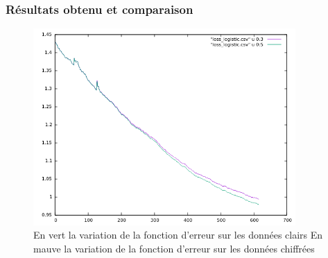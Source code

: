 \documentclass[a4paper,12pt]{article}
\begin{document}
  \subsubsection{Résultats obtenu et comparaison}
  \begin{figure}[h!]\begin{center}
    \includegraphics[width=10cm]{loss_logistic_regression.png}
    \caption{En vert la variation de la fonction d'erreur sur les données clairs\newline
            En mauve la variation de la fonction d'erreur sur les données chiffrées}
     \label{fig:loss_logistic}
  \end{center}
  \end{figure}
\newpage


\end{document}
